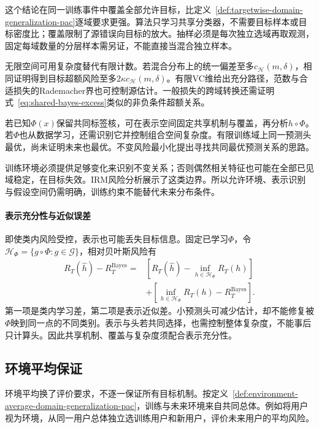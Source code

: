 这个结论在同一训练事件中覆盖全部允许目标，比定义~\ref{def:targetwise-domain-generalization-pac}逐域要求更强。算法只学习共享分类器，不需要目标样本或目标密度比；覆盖限制了源错误向目标的放大。抽样必须是每次独立选域再取观测，固定每域数量的分层样本需另证，不能直接当混合独立样本。

无限空间可用复杂度替代有限计数。若混合分布上的统一偏差至多$c_{\mathcal H}(m,\delta)$，相同证明得到目标超额风险至多$2\kappa c_{\mathcal H}(m,\delta)$。有限VC维给出充分路径，范数与合适损失的Rademacher界也可控制源估计。一般损失的跨域转换还需证明式~\eqref{eq:shared-bayes-excess}类似的非负条件超额关系。

若已知$\Phi(x)$保留共同标签核，可在表示空间固定共享机制与覆盖，再分析$h\circ\Phi$。若$\Phi$也从数据学习，还需识别它并控制组合空间复杂度。有限训练域上同一预测头最优，尚未证明未来也最优。不变风险最小化提出寻找共同最优预测关系的思路。

训练环境必须提供足够变化来识别不变关系；否则偶然相关特征也可能在全部已见域稳定，在目标失效。IRM风险分析展示了这类边界。所以允许环境、表示识别与假设空间仍需明确，训练约束不能替代未来分布条件。

\paragraph{表示充分性与近似误差}

即使类内风险受控，表示也可能丢失目标信息。固定已学习$\Phi$，令$\mathcal H_\Phi=\{g\circ\Phi:g\in\mathcal G\}$，相对贝叶斯风险有
\begin{equation}
 \begin{aligned}
 R_T(\widehat h)-R_T^{\mathrm{Bayes}}
 ={}&\left[R_T(\widehat h)-\inf_{h\in\mathcal H_\Phi}R_T(h)\right]\\
 &+\left[\inf_{h\in\mathcal H_\Phi}R_T(h)-R_T^{\mathrm{Bayes}}\right].
 \end{aligned}
 \label{eq:transfer-representation-bias}
\end{equation}
第一项是类内学习差，第二项是表示近似差。小预测头可减少估计，却不能修复被$\Phi$映到同一点的不同类别。表示与头若共同选择，也需控制整体复杂度，不能事后只计算头。因此共享机制、覆盖与复杂度须配合表示充分性。

\subsection{环境平均保证}
\label{sec:dg-random-environments}

环境平均换了评价要求，不逐一保证所有目标机制。按定义~\ref{def:environment-average-domain-generalization-pac}，训练与未来环境来自共同总体。例如将用户视为环境，从同一用户总体独立选训练用户和新用户，评价未来用户的平均风险。


